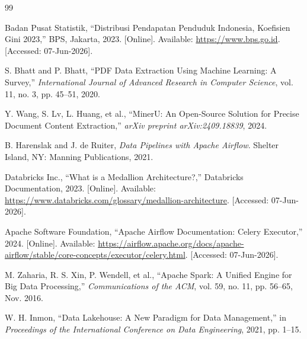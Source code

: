\documentclass[10pt, a4paper, twocolumn]{article}
\begin{document}
\begin{thebibliography}{99}

Badan Pusat Statistik, ``Distribusi Pendapatan Penduduk Indonesia, Koefisien Gini 2023,'' BPS, Jakarta, 2023. [Online]. Available: \url{https://www.bps.go.id}. [Accessed: 07-Jun-2026].

S. Bhatt and P. Bhatt, ``PDF Data Extraction Using Machine Learning: A Survey,'' \textit{International Journal of Advanced Research in Computer Science}, vol. 11, no. 3, pp. 45--51, 2020.

Y. Wang, S. Lv, L. Huang, et al., ``MinerU: An Open-Source Solution for Precise Document Content Extraction,'' \textit{arXiv preprint arXiv:2409.18839}, 2024.

B. Harenslak and J. de Ruiter, \textit{Data Pipelines with Apache Airflow}. Shelter Island, NY: Manning Publications, 2021.

Databricks Inc., ``What is a Medallion Architecture?,'' Databricks Documentation, 2023. [Online]. Available: \url{https://www.databricks.com/glossary/medallion-architecture}. [Accessed: 07-Jun-2026].

Apache Software Foundation, ``Apache Airflow Documentation: Celery Executor,'' 2024. [Online]. Available: \url{https://airflow.apache.org/docs/apache-airflow/stable/core-concepts/executor/celery.html}. [Accessed: 07-Jun-2026].

M. Zaharia, R. S. Xin, P. Wendell, et al., ``Apache Spark: A Unified Engine for Big Data Processing,'' \textit{Communications of the ACM}, vol. 59, no. 11, pp. 56--65, Nov. 2016.

W. H. Inmon, ``Data Lakehouse: A New Paradigm for Data Management,'' in \textit{Proceedings of the International Conference on Data Engineering}, 2021, pp. 1--15.

\end{thebibliography}
\end{document}
